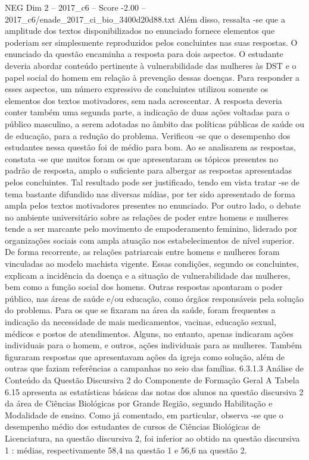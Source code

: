 \begin{textsample}{NEG Dim 2 – 2017\_c6 – Score -2.00 – 2017\_c6/enade\_2017\_ci\_bio\_3400d20d88.txt}
Além disso, ressalta -se que a amplitude dos textos disponibilizados no enunciado fornece elementos que poderiam ser simplesmente reproduzidos pelos concluintes nas suas respostas.
O enunciado da questão encaminha a resposta para dois aspectos.
O estudante deveria abordar conteúdo pertinente à vulnerabilidade das mulheres às DST e o papel social do homem em relação à prevenção dessas doenças.
Para responder a esses aspectos, um número expressivo de concluintes utilizou somente os elementos dos textos motivadores, sem nada acrescentar.
A resposta deveria conter também uma segunda parte, a indicação de duas ações voltadas para o público masculino, a serem adotadas no âmbito das políticas públicas de saúde ou de educação, para a redução do problema.
Verificou -se que o desempenho dos estudantes nessa questão foi de médio para bom.
Ao se analisarem as respostas, constata -se que muitos foram os que apresentaram os tópicos presentes no padrão de resposta, amplo o suficiente para albergar as respostas apresentadas pelos concluintes.
Tal resultado pode ser justificado, tendo em vista tratar -se de tema bastante difundido nas diversas mídias, por ter sido apresentado de forma ampla pelos textos motivadores presentes no enunciado.
Por outro lado, o debate no ambiente universitário sobre as relações de poder entre homens e mulheres tende a ser marcante pelo movimento de empoderamento feminino, liderado por organizações sociais com ampla atuação nos estabelecimentos de nível superior.
De forma recorrente, as relações patriarcais entre homens e mulheres foram vinculadas ao modelo machista vigente.
Essas condições, segundo os concluintes, explicam a incidência da doença e a situação de vulnerabilidade das mulheres, bem como a função social dos homens.
Outras respostas apontaram o poder público, nas áreas de saúde e/ou educação, como órgãos responsáveis pela solução do problema.
Para os que se fixaram na área da saúde, foram frequentes a indicação da necessidade de mais medicamentos, vacinas, educação sexual, médicos e postos de atendimentos.
Alguns, no entanto, apenas indicaram ações individuais para o homem, e outros, ações individuais para as mulheres.
Também figuraram respostas que apresentavam ações da igreja como solução, além de outras que faziam referências a campanhas no seio das famílias. 6.3.1.3 Análise de Conteúdo da Questão Discursiva 2 do Componente de Formação Geral A Tabela 6.15 apresenta as estatísticas básicas das notas dos alunos na questão discursiva 2 da área de Ciências Biológicas por Grande Região, segundo Habilitação e Modalidade de ensino.
Como já comentado, em particular, observa -se que o desempenho médio dos estudantes de cursos de Ciências Biológicas de Licenciatura, na questão discursiva 2, foi inferior ao obtido na questão discursiva 1 : médias, respectivamente 58,4 na questão 1 e 56,6 na questão 2.

\end{textsample}
